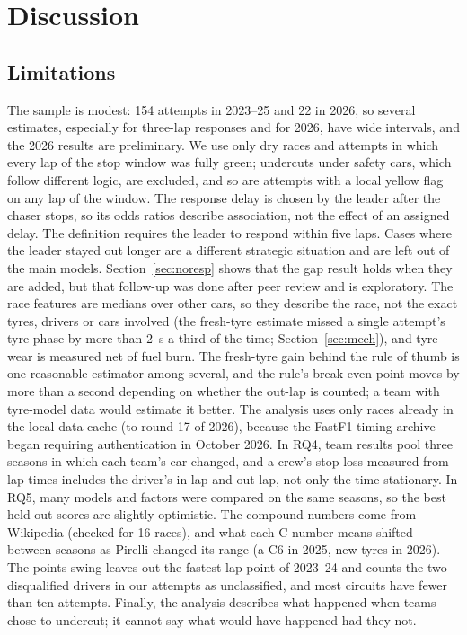 \documentclass[12pt]{article}
\begin{document}
\section{Discussion}


\subsection{Limitations}
The sample is modest: 154 attempts in 2023--25 and 22 in 2026, so several estimates, especially for three-lap responses and for 2026, have wide intervals, and the 2026 results are preliminary. We use only dry races and attempts in which every lap of the stop window was fully green; undercuts under safety cars, which follow different logic, are excluded, and so are attempts with a local yellow flag on any lap of the window. The response delay is chosen by the leader after the chaser stops, so its odds ratios describe association, not the effect of an assigned delay. The definition requires the leader to respond within five laps. Cases where the leader stayed out longer are a different strategic situation and are left out of the main models. Section~\ref{sec:noresp} shows that the gap result holds when they are added, but that follow-up was done after peer review and is exploratory. The race features are medians over other cars, so they describe the race, not the exact tyres, drivers or cars involved (the fresh-tyre estimate missed a single attempt's tyre phase by more than 2~s a third of the time; Section~\ref{sec:mech}), and tyre wear is measured net of fuel burn. The fresh-tyre gain behind the rule of thumb is one reasonable estimator among several, and the rule's break-even point moves by more than a second depending on whether the out-lap is counted; a team with tyre-model data would estimate it better. The analysis uses only races already in the local data cache (to round 17 of 2026), because the FastF1 timing archive began requiring authentication in October 2026. In RQ4, team results pool three seasons in which each team's car changed, and a crew's stop loss measured from lap times includes the driver's in-lap and out-lap, not only the time stationary. In RQ5, many models and factors were compared on the same seasons, so the best held-out scores are slightly optimistic. The compound numbers come from Wikipedia (checked for 16 races), and what each C-number means shifted between seasons as Pirelli changed its range (a C6 in 2025, new tyres in 2026). The points swing leaves out the fastest-lap point of 2023--24 and counts the two disqualified drivers in our attempts as unclassified, and most circuits have fewer than ten attempts. Finally, the analysis describes what happened when teams chose to undercut; it cannot say what would have happened had they not.
\end{document}
